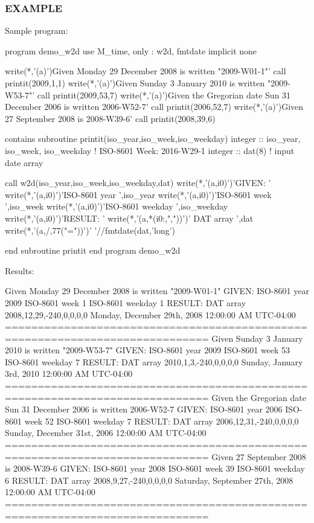 \begin{DoxyVerb}
\subsubsection*{E\+X\+A\+M\+P\+LE}

\begin{DoxyVerb}Sample program:

 program demo_w2d
 use M_time, only : w2d, fmtdate
 implicit none

    write(*,'(a)')Given Monday 29 December 2008 is written "2009-W01-1"'
    call printit(2009,1,1)
    write(*,'(a)')Given Sunday 3 January 2010 is written "2009-W53-7"'
    call printit(2009,53,7)
    write(*,'(a)')Given the Gregorian date Sun 31 December 2006 is written 2006-W52-7'
    call printit(2006,52,7)
    write(*,'(a)')Given 27 September 2008 is 2008-W39-6'
    call printit(2008,39,6)

 contains
 subroutine printit(iso_year,iso_week,iso_weekday)
 integer  :: iso_year, iso_week, iso_weekday ! ISO-8601 Week:   2016-W29-1
 integer  :: dat(8)                          ! input date array

    call w2d(iso_year,iso_week,iso_weekday,dat)
    write(*,'(a,i0)')'GIVEN:           '
    write(*,'(a,i0)')'ISO-8601 year    ',iso_year
    write(*,'(a,i0)')'ISO-8601 week    ',iso_week
    write(*,'(a,i0)')'ISO-8601 weekday ',iso_weekday
    write(*,'(a,i0)')'RESULT:          '
    write(*,'(a,*(i0:,","))')'   DAT array        ',dat
    write(*,'(a,/,77("="))')'    '//fmtdate(dat,'long')

 end subroutine printit
 end program demo_w2d

Results:

 Given Monday 29 December 2008 is written "2009-W01-1"
 GIVEN:
 ISO-8601 year    2009
 ISO-8601 week    1
 ISO-8601 weekday 1
 RESULT:
    DAT array        2008,12,29,-240,0,0,0,0
     Monday, December 29th, 2008 12:00:00 AM UTC-04:00
 =============================================================================
 Given Sunday 3 January 2010 is written "2009-W53-7"
 GIVEN:
 ISO-8601 year    2009
 ISO-8601 week    53
 ISO-8601 weekday 7
 RESULT:
    DAT array        2010,1,3,-240,0,0,0,0
     Sunday, January 3rd, 2010 12:00:00 AM UTC-04:00
 =============================================================================
 Given the Gregorian date Sun 31 December 2006 is written 2006-W52-7
 GIVEN:
 ISO-8601 year    2006
 ISO-8601 week    52
 ISO-8601 weekday 7
 RESULT:
    DAT array        2006,12,31,-240,0,0,0,0
     Sunday, December 31st, 2006 12:00:00 AM UTC-04:00
 =============================================================================
 Given 27 September 2008 is 2008-W39-6
 GIVEN:
 ISO-8601 year    2008
 ISO-8601 week    39
 ISO-8601 weekday 6
 RESULT:
    DAT array        2008,9,27,-240,0,0,0,0
     Saturday, September 27th, 2008 12:00:00 AM UTC-04:00
 =============================================================================
\end{DoxyVerb}



\end{DoxyVerb}
